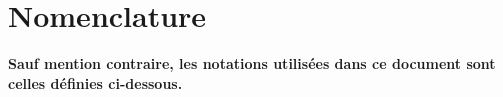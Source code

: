 

\chapter*{Nomenclature}

\mtcaddchapter%


\textbf{Sauf mention contraire, les notations utilisées dans ce document sont celles définies ci-dessous.}

\glsfindwidesttoplevelname%


